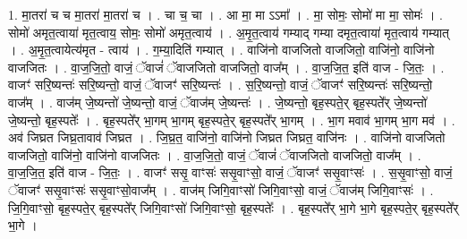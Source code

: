 \documentclass[17pt]{extarticle}
\begin{document}
1. मा॒तरा॑ च च मा॒तरा॑ मा॒तरा॑ च । . चा च॒ चा । . आ मा॒ मा ऽऽमा᳚ । . मा॒ सोमः॒ सोमो॑ मा मा॒ सोमः॑ । . सोमो॑ अमृत॒त्वाया॑ मृत॒त्वाय॒ सोमः॒ सोमो॑ अमृत॒त्वाय॑ । . अ॒मृ॒त॒त्वाय॑ गम्याद् गम्या दमृत॒त्वाया॑ मृत॒त्वाय॑ गम्यात् । . अ॒मृ॒त॒त्वायेत्य॑मृत - त्वाय॑ । . ग॒म्या॒दिति॑ गम्यात् । . वाजि॑नो वाजजितो वाजजितो॒ वाजि॑नो॒ वाजि॑नो वाजजितः । . वा॒ज॒जि॒तो॒ वाजं॒ ॅवाजं॑ ॅवाजजितो वाजजितो॒ वाज᳚म् । . वा॒ज॒जि॒त॒ इति॑ वाज - जि॒तः॒ । . वाजꣳ॑ सरि॒ष्यन्तः॑ सरि॒ष्यन्तो॒ वाजं॒ ॅवाजꣳ॑ सरि॒ष्यन्तः॑ । . स॒रि॒ष्यन्तो॒ वाजं॒ ॅवाजꣳ॑ सरि॒ष्यन्तः॑ सरि॒ष्यन्तो॒ वाज᳚म् । . वाज॑म् जे॒ष्यन्तो॑ जे॒ष्यन्तो॒ वाजं॒ ॅवाज॑म् जे॒ष्यन्तः॑ । . जे॒ष्यन्तो॒ बृह॒स्पते॒र् बृह॒स्पते᳚र् जे॒ष्यन्तो॑ जे॒ष्यन्तो॒ बृह॒स्पतेः᳚ । . बृह॒स्पते᳚र् भा॒गम् भा॒गम् बृह॒स्पते॒र् बृह॒स्पते᳚र् भा॒गम् । . भा॒ग मवाव॑ भा॒गम् भा॒ग मव॑ । . अव॑ जिघ्रत जिघ्र॒तावाव॑ जिघ्रत । . जि॒घ्र॒त॒ वाजि॑नो॒ वाजि॑नो जिघ्रत जिघ्रत॒ वाजि॑नः । . वाजि॑नो वाजजितो वाजजितो॒ वाजि॑नो॒ वाजि॑नो वाजजितः । . वा॒ज॒जि॒तो॒ वाजं॒ ॅवाजं॑ ॅवाजजितो वाजजितो॒ वाज᳚म् । . वा॒ज॒जि॒त॒ इति॑ वाज - जि॒तः॒ । . वाजꣳ॑ ससृ॒ वाꣳसः॑ ससृ॒वाꣳसो॒ वाजं॒  ॅवाजꣳ॑ ससृ॒वाꣳसः॑ । . स॒सृ॒वाꣳसो॒ वाजं॒ ॅवाजꣳ॑ ससृ॒वाꣳसः॑ ससृ॒वाꣳसो॒वाज᳚म् । . वाज॑म् जिगि॒वाꣳसो॑ जिगि॒वाꣳसो॒ वाजं॒ ॅवाज॑म् जिगि॒वाꣳसः॑ । . जि॒गि॒वाꣳसो॒ बृह॒स्पते॒र् बृह॒स्पते᳚र् जिगि॒वाꣳसो॑ जिगि॒वाꣳसो॒ बृह॒स्पतेः᳚ । . बृह॒स्पते᳚र् भा॒गे भा॒गे बृह॒स्पते॒र् बृह॒स्पते᳚र् भा॒गे । \newline
\end{document}
